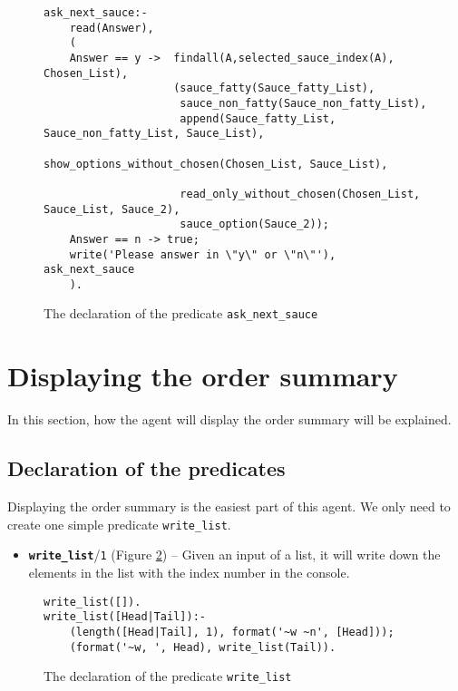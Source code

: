 \documentclass[12pt,a4paper]{article}
\newcommand{\varname}[1]{\texttt{#1}}
\newcommand{\varnamebf}[1]{\textbf{\texttt{#1}}}
\newcommand{\predprot}[2]{{\color{MidnightBlue}\varnamebf{#1}}/{\color{Mulberry}\varname{#2}}}
\newcommand{\predname}[1]{{\color{MidnightBlue}\varname{#1}}}
\begin{document}
\begin{figure}[H]
	\centering
\begin{lstlisting}[style=Prolog-pygsty]
% Define ask_next_sauce
ask_next_sauce:-
	read(Answer),
    (
	Answer == y ->  findall(A,selected_sauce_index(A), Chosen_List),
                    (sauce_fatty(Sauce_fatty_List),
                     sauce_non_fatty(Sauce_non_fatty_List),
                     append(Sauce_fatty_List, Sauce_non_fatty_List, Sauce_List),
                     show_options_without_chosen(Chosen_List, Sauce_List),
                        
            		 read_only_without_chosen(Chosen_List, Sauce_List, Sauce_2),
            		 sauce_option(Sauce_2));
	Answer == n -> true;
	write('Please answer in \"y\" or \"n\"'), ask_next_sauce
    ).
\end{lstlisting}
	\caption{The declaration of the predicate \predname{ask\_next\_sauce}} 
	\label{fig:ask-sauce}
\end{figure}


\section{Displaying the order summary}
\label{sec:display}

In this section, how the agent will display the order summary will be explained.

\subsection{Declaration of the predicates}

Displaying the order summary is the easiest part of this agent. We only need to create one simple predicate \predname{write\_list}.

\begin{itemize}
    \item \predprot{write\_list}{1} (Figure \ref{fig:write-list}) -- Given an input of a list, it will write down the elements in the list with the index number in the console.
\end{itemize}

\begin{figure}[H]
	\centering
\begin{lstlisting}[style=Prolog-pygsty]
% Define write_list
write_list([]).
write_list([Head|Tail]):-
    (length([Head|Tail], 1), format('~w ~n', [Head]));
    (format('~w, ', Head), write_list(Tail)).
\end{lstlisting}
	\caption{The declaration of the predicate \predname{write\_list}} 
	\label{fig:write-list}
\end{figure}
\end{document}
